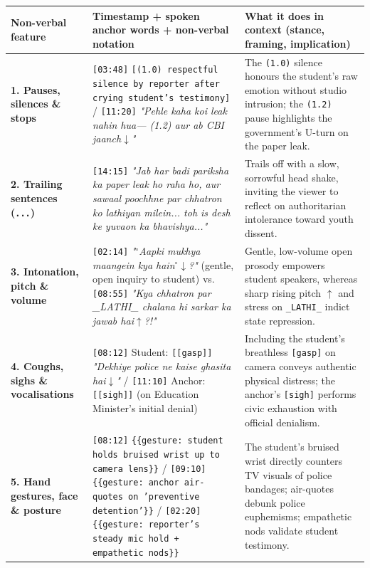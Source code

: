 \documentclass[10pt,a4paper]{article}
\begin{document}
\begin{longtable}{|p{}|p{}|p{}|}
\hline
Non-verbal feature & Timestamp + spoken anchor words + non-verbal notation & What it does in context (stance, framing, implication) \\ \hline \endhead
\textbf{1. Pauses, silences \& stops} & \texttt{[03:48]} \texttt{[(1.0) respectful silence by reporter after crying student's testimony]} / \texttt{[11:20]} \textit{"Pehle kaha koi leak nahin hua--- (1.2) aur ab CBI jaanch$\downarrow$"} & The \texttt{(1.0)} silence honours the student's raw emotion without studio intrusion; the \texttt{(1.2)} pause highlights the government's U-turn on the paper leak. \\ \hline
\textbf{2. Trailing sentences (\texttt{...})} & \texttt{[14:15]} \textit{"Jab har badi pariksha ka paper leak ho raha ho, aur sawaal poochhne par chhatron ko lathiyan milein... toh is desh ke yuvaon ka bhavishya..."} & Trails off with a slow, sorrowful head shake, inviting the viewer to reflect on authoritarian intolerance toward youth dissent. \\ \hline
\textbf{3. Intonation, pitch \& volume} & \texttt{[02:14]} \textit{"$^\circ$Aapki mukhya maangein kya hain$^\circ$$\downarrow$?"} (gentle, open inquiry to student) vs. \texttt{[08:55]} \textit{"Kya chhatron par \_LATHI\_ chalana hi sarkar ka jawab hai$\uparrow$?!"} & Gentle, low-volume open prosody empowers student speakers, whereas sharp rising pitch \texttt{$\uparrow$} and stress on \texttt{\_LATHI\_} indict state repression. \\ \hline
\textbf{4. Coughs, sighs \& vocalisations} & \texttt{[08:12]} Student: \texttt{[[gasp]]} \textit{"Dekhiye police ne kaise ghasita hai$\downarrow$"} / \texttt{[11:10]} Anchor: \texttt{[[sigh]]} (on Education Minister's initial denial) & Including the student's breathless \texttt{[gasp]} on camera conveys authentic physical distress; the anchor's \texttt{[sigh]} performs civic exhaustion with official denialism. \\ \hline
\textbf{5. Hand gestures, face \& posture} & \texttt{[08:12]} \texttt{\{\{gesture: student holds bruised wrist up to camera lens\}\}} / \texttt{[09:10]} \texttt{\{\{gesture: anchor air-quotes on 'preventive detention'\}\}} / \texttt{[02:20]} \texttt{\{\{gesture: reporter's steady mic hold + empathetic nods\}\}} & The student's bruised wrist directly counters TV visuals of police bandages; air-quotes debunk police euphemisms; empathetic nods validate student testimony. \\ \hline
\end{longtable}
\end{document}
